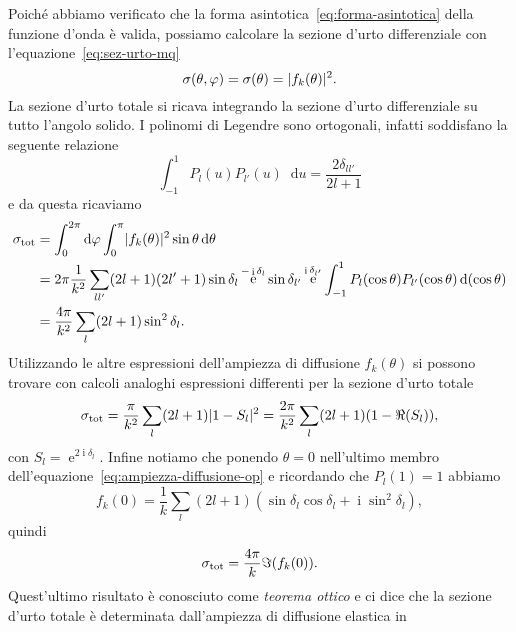 \documentclass[a4paper,fleqn,twoside,12pt]{article}
\renewcommand{\phi}{\varphi}
\newcommand*{\dd}{\mathop{}\!\mathrm{d}} %
\DeclareMathOperator{\e}{\mathrm{e}} %
\DeclareMathOperator{\uimm}{\mathrm{i}} %
\DeclarePairedDelimiter{\abs}{\lvert}{\rvert}
\begin{document}
Poiché abbiamo verificato che la forma asintotica~\eqref{eq:forma-asintotica}
della funzione d'onda è valida, possiamo calcolare la sezione d'urto
differenziale con l'equazione~\eqref{eq:sez-urto-mq}
\begin{equation}
  \sigma(\theta,\phi) = \sigma(\theta) = \abs{f_{k}(\theta)}^{2}.
\end{equation}
La sezione d'urto totale si ricava integrando la sezione d'urto differenziale su
tutto l'angolo solido.  I polinomi di Legendre sono ortogonali, infatti
soddisfano la seguente relazione
\begin{equation}
  \int_{-1}^{1}P_{l}(u)P_{l'}(u)\dd u = \frac{2\delta_{ll'}}{2l+1}
\end{equation}
e da questa ricaviamo
\begin{equation}
  \label{eq:serie-sfasamenti}
  \begin{split}
    \sigma_{\textup{tot}} &= \int_{0}^{2\pi}\dd \phi \int_{0}^{\pi}
    \abs{f_{k}(\theta)}^{2} \sin\theta \dd\theta \\
    &= 2\pi \frac{1}{k^{2}} \sum_{ll'}(2l+1)(2l'+1) \sin\delta_{l} \e^{-\uimm
      \delta_{l}} \sin\delta_{l'}\e^{\uimm \delta_{l'}}
    \int_{-1}^{1}P_{l}(\cos\theta)P_{l'}(\cos\theta) \dd(\cos\theta) \\
    &= \frac{4\pi}{k^{2}} \sum_{l}(2l+1)\sin^{2}\delta_{l}.
  \end{split}
\end{equation}
Utilizzando le altre espressioni dell'ampiezza di diffusione $f_{k}(\theta)$ si
possono trovare con calcoli analoghi espressioni differenti per la sezione
d'urto totale
\begin{equation}
  \sigma_{\textup{tot}} = \frac{\pi}{k^{2}} \sum_{l}(2l+1)\abs{1 - S_{l}}^{2} =
  \frac{2\pi}{k^{2}} \sum_{l}(2l+1)(1-\Re(S_{l})),
\end{equation}
con $S_{l} = \e^{2\uimm\delta_{l}}$.  Infine notiamo che ponendo $\theta = 0$
nell'ultimo membro dell'equazione~\eqref{eq:ampiezza-diffusione-op} e ricordando
che $P_{l}(1) = 1$ abbiamo
\begin{equation}
  f_{k}(0) = \frac{1}{k} \sum_{l}(2l+1)(\sin\delta_{l}\cos\delta_{l} + \uimm
  \sin^{2}\delta_{l}),
\end{equation}
quindi
\begin{equation}
  \sigma_{\textup{tot}} = \frac{4\pi}{k} \Im(f_{k}(0)).
\end{equation}
Quest'ultimo risultato è conosciuto come \emph{teorema ottico} e ci dice che la
sezione d'urto totale è determinata dall'ampiezza di diffusione elastica in
\end{document}

